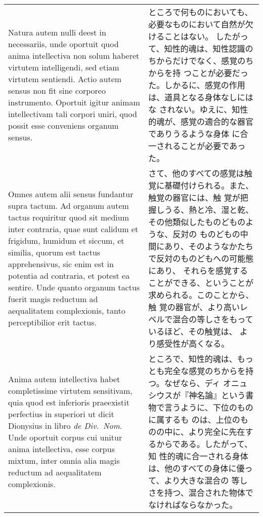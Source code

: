 \documentclass[paper=a4paper,fontsize=10pt,jafontsize=9pt,titlepage]{jlreq}
\begin{document}
\begin{longtable}{p{21em}p{21em}}
\\


 Natura autem nulli deest in necessariis, unde oportuit quod anima
 intellectiva non solum haberet virtutem intelligendi, sed etiam
 virtutem sentiendi. Actio autem sensus non fit sine corporeo
 instrumento. Oportuit igitur animam intellectivam tali corpori uniri,
 quod possit esse conveniens organum sensus.

&

 ところで何ものにおいても、必要なものにおいて自然が欠けることはない。
 したがって、知性的魂は、知性認識のちからだけでなく、感覚のちからを持
 つことが必要だった。しかるに、感覚の作用は、道具となる身体なしにはな
 されない。ゆえに、知性的魂が、感覚の適合的な器官でありうるような身体
 に合一されることが必要であった。
 
\\


 Omnes autem alii sensus fundantur supra tactum. Ad organum autem
 tactus requiritur quod sit medium inter contraria, quae sunt calidum
 et frigidum, humidum et siccum, et similia, quorum est tactus
 apprehensivus, sic enim est in potentia ad contraria, et potest ea
 sentire. Unde quanto organum tactus fuerit magis reductum ad
 aequalitatem complexionis, tanto perceptibilior erit tactus.

&

さて、他のすべての感覚は触覚に基礎付けられる。また、触覚の器官には、触
覚が把握しうる、熱と冷、湿と乾、その他類似したものどものような、反対の
ものどもの中間にあり、そのようなかたちで反対のものどもへの可能態にあり、
それらを感覚することができる、ということが求められる。このことから、触
覚の器官が、より高いレベルで混合の等しさをもっているほど、その触覚は、
より感受性が高くなる。
 
\\


 Anima autem intellectiva habet completissime virtutem sensitivam,
 quia quod est inferioris praeexistit perfectius in superiori ut dicit
 Dionysius in libro {\itshape de Div.~Nom}. Unde oportuit corpus cui unitur anima
 intellectiva, esse corpus mixtum, inter omnia alia magis reductum ad
 aequalitatem complexionis.

&

 ところで、知性的魂は、もっとも完全な感覚のちからを持つ。なぜなら、ディ
 オニュシウスが『神名論』という書物で言うように、下位のものに属するも
 のは、上位のものの中に、より完全に先在するからである。したがって、知
 性的魂に合一される身体は、他のすべての身体に優って、より大きな混合の
 等しさを持つ、混合された物体でなければならなかった。
 

\end{longtable}
\end{document}

